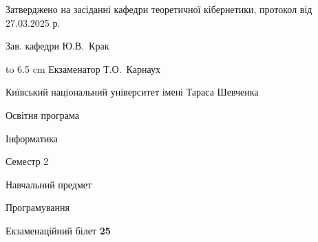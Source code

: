 \documentclass[12pt, ukrainian]{article}
\begin{document}
{\smallskip\smallskip \begin {scriptsize} Затверджено на засіданні кафедри теоретичної кібернетики, протокол   від   27.03.2025 р.\par\smallskip\smallskip\smallskip\smallskip
{\parbox {6.5 cm} {Зав. кафедри \dotfill Ю.В.~Крак}}\hspace {0.7cm} {\hbox to 6.5 cm { Екзаменатор \dotfill Т.О.~Карнаух}} \end{scriptsize}}
\newpage
{{\begin {scriptsize}\par
{ \center  Київський національний університет імені Тараса Шевченка \par}
{\parbox {5 cm}{Освітня програма \hfill}{\parbox {7 cm}{Інформатика\hfill}}\parbox {6 cm}{\hfill Семестр 2}}\par
{\parbox {5 cm} {Навчальний предмет \hfill}\parbox {7 cm}{Програмування \hfill}\parbox {6cm}{\hfill}\par}\vspace{-15pt} \end{scriptsize}}{\center Екзаменаційний білет \No \textbf { 25 }\par}}
\end{document}
